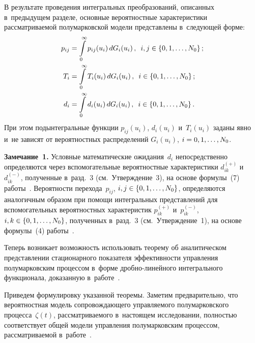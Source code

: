 \begin{multicols}{2}
  В результате проведения интегральных преобразований, описанных 
в~предыду\-щем разделе, основные вероятностные характеристики 
рас\-смат\-ри\-ва\-емой полумарковской модели пред\-став\-ле\-ны\linebreak
 в~сле\-ду\-ющей форме:
  \begin{align}
  p_{ij} &= \int\limits_0^\infty p_{ij}(u_i)\,dG_i(u_i)\,, \enskip i,j\in \{0,1,\ldots 
,N_0\}\,;
  \label{e2-sh}\\
  T_{i} &= \int\limits_0^\infty T_{i}(u_i)\,dG_i(u_i)\,, \enskip i\in \{0,1,\ldots 
,N_0\}\,;
  \label{e3-sh}\\
  d_{i} &= \int\limits_0^\infty d_{i}(u_i)\,dG_i(u_i)\,, \enskip i\in \{0,1,\ldots 
,N_0\}\,.
  \label{e4-sh}
  \end{align}
    При этом подынтегральные функции $p_{ij}(u_i)$, $d_i(u_i)$ и~$T_i(u_i)$  
заданы явно и~не зависят от вероятностных распределений $G_i(u_i)$, $i\hm= 
0,1,\ldots ,N_0$. 
  
  \noindent
  \textbf{Замечание~1.} Условные математические ожидания~$d_i$ 
непосредственно определяются через вспомогательные вероятностные 
характеристики $d_{ik}^{(+)}$ и~$d_{ik}^{(-)}$, полученные в~разд.~3 
(см.\ Утверж\-де\-ние~3), на основе фор\-му\-лы~(7) работы~\cite{1-sh}. Вероятности 
перехода~$p_{ij}$, $i,j\hm\in \{0,1,\ldots , N_0\}$, определяются аналогичным 
образом при помощи интегральных пред\-став\-ле\-ний для вспомогательных 
вероятностных характеристик $p_{ik}^{(+)}$ и~$p_{ik}^{(-)}$, $i,k\hm\in 
\{0,1,\ldots ,N_0\}$, полученных в~разд.~3 (см.\ Утверж\-де\-ние~1), на осно\-ве 
формулы~(4) работы~\cite{1-sh}. 

  \smallskip
  
  Теперь возникает воз\-мож\-ность использовать тео\-ре\-му об аналитическом 
пред\-став\-ле\-нии стационарного показателя эффективности управ\-ле\-ния 
полумарковским процессом в~форме дроб\-но-ли\-ней\-но\-го интегрального 
функционала, доказанную в~работе~\cite{7-sh}. 
  
  Приведем формулировку указанной тео\-ре\-мы. Заметим предварительно, что 
вероятностная модель со\-про\-вож\-да\-юще\-го управ\-ля\-емо\-го полумарковского 
процесса~$\zeta(t)$, рас\-смат\-ри\-ва\-емо\-го в~на\-сто\-ящем исследовании, пол\-ностью 
соответствует об\-щей модели управ\-ле\-ния полумарковским процессом, 
рас\-смат\-ри\-ва\-емой в~работе~\cite{7-sh}.
  
  \smallskip
  

\end{multicols}
